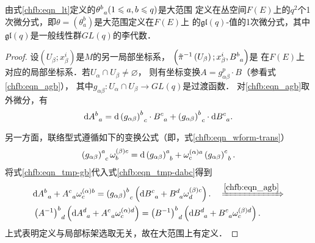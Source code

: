 \begin{theorem}\label{chfb:thm_ltg}
由式\eqref{chfb:eqn_lt}定义的$\theta_{\hphantom{a}a}^{b} (1 \leqslant a,b \leqslant q)$是大范围
定义在丛空间$F(E)$上的$q^{2}$个1次微分式，即$\theta=(\theta_{a}^{b})$是大范围定义在$F(E)$上
的$\mathfrak{g l}(q)$-值的1次微分式，其中$\mathfrak{gl}(q)$是一般线性群$GL(q)$的李代数．
\end{theorem}

\begin{proof}
设$\left(U_{\beta} ; x_{\beta}^{i}\right)$是$M$的另一局部坐标系，
$\left(\tilde{\pi}^{-1}\left(U_{\beta}\right) ; x_{\beta}^{i}, B_{\hphantom{a}a}^{b}\right)$是
在$F(E)$上对应的局部坐标系．若$U_{\alpha} \cap U_{\beta} \neq \varnothing$，
则有坐标变换$A=g_{\alpha \beta}^p \cdot B$（参看式\eqref{chfb:eqn_agb}），
其中$g_{\alpha \beta}: U_{\alpha} \cap U_{\beta} \rightarrow GL(q)$是过渡函数．
对\eqref{chfb:eqn_agb}取外微分，有
\begin{equation}\label{chfb:eqn_tmp-dabc}
    \mathrm{d} A_{\hphantom{a}a}^{b}=\mathrm{d}\left(g_{\alpha \beta}\right)_{\hphantom{a}c}^{b} \cdot 
    B_{\hphantom{a}a}^{c}+\left(g_{\alpha \beta}\right)_{\hphantom{a}c}^{b} \cdot \mathrm{d} B_{\hphantom{a}a}^{c}.
\end{equation}

另一方面，联络型式遵循如下的变换公式（即，式\eqref{chfb:eqn_wform-trans}）
\begin{equation}\label{chfb:eqn_tmp-gb}
    \left(g_{\alpha \beta}\right)_{\hphantom{a}c}^{a} \omega_{b}^{(\beta) c}=\mathrm{d}
    \left(g_{\alpha\beta}\right)_{\hphantom{a}b}^{a}+
    \omega_{c}^{(\alpha) a} \left(g_{\alpha \beta}\right)_{\hphantom{a}b}^{c}.
\end{equation}
将式\eqref{chfb:eqn_tmp-gb}代入式\eqref{chfb:eqn_tmp-dabc}得到 
\begin{align*}
    &\mathrm{d} A_{\hphantom{a}a}^{b}+A_{\hphantom{a}a}^{c}  \omega_{c}^{(\alpha) b}
    =\left(g_{\alpha \beta}\right)_{\hphantom{a}c}^{b}\left(\mathrm{d} B_{\hphantom{a}a}^{c}
    +B_{\hphantom{a}a}^{d}  \omega_{d}^{(\beta) c}\right).
\quad \xRightarrow{\ref{chfb:eqn_agb}} \\
&\left(A^{-1}\right)_{\hphantom{a}d}^{b} \left(\mathrm{d} A_{\hphantom{a}a}^{d}
+A_{\hphantom{a}a}^{c}  \omega_{c}^{(\alpha) d}\right)
=\left(B^{-1}\right)_{\hphantom{a}d}^{b}\left(\mathrm{d} B_{\hphantom{a}a}^{d}
+B_{\hphantom{a}a}^{c}  \omega_{c}^{(\beta) d}\right) .
\end{align*}
上式表明定义与局部标架选取无关，故在大范围上有定义．
\end{proof}

